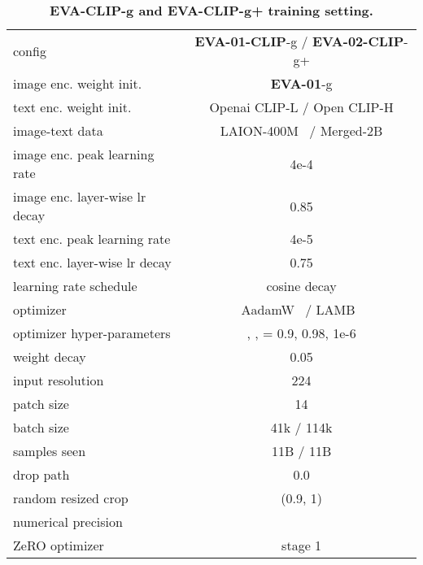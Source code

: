 \documentclass[10pt,twocolumn,letterpaper]{article}
\newcommand{\tablestyle}[2]{\setlength{\tabcolsep}{#1}\renewcommand{\arraystretch}{#2}\centering\footnotesize}
\newcommand{\evapurple}[1]{\textcolor{eva01purple}{#1}}
\newcommand{\evablue}[1]{\textcolor{00blue!80}{#1}}
\newcommand{\evaOne}{{\textbf{\evapurple{EVA-01}}}\xspace}
\newcommand{\evaclip}{{\textbf{\evablue{EVA-CLIP}}}\xspace}
\newcommand{\evaOneclip}{{\textbf{\evablue{EVA-01-CLIP}}}\xspace}
\newcommand{\evaTwoclip}{{\textbf{\evablue{EVA-02-CLIP}}}\xspace}
\newcommand{\suptext}[1]{}
\begin{document}
\begin{table}[h]
\centering
\tablestyle{6pt}{1.2}
\scriptsize
\begin{tabular}{l|c}
config & \evaOneclip-g / \evaTwoclip-g+\\
\shline

image enc. weight init. & \evaOne-g \\
text enc. weight init. & Openai CLIP-L / Open CLIP-H \\

image-text data & LAION-400M~\cite{laion400m} / Merged-2B \\

image enc. peak learning rate &  4e-4 \\
image enc. layer-wise lr decay~\cite{clark2020electra, bao2021beit} & 0.85 \\
text enc. peak learning rate &  4e-5 \\
text enc. layer-wise lr decay~\cite{clark2020electra, bao2021beit} & 0.75 \\

learning rate schedule & cosine decay \\

optimizer & AadamW~\cite{adam,Loshchilov2019adamw} / LAMB~\cite{lamb} \\
optimizer hyper-parameters & , ,  = 0.9, 0.98, 1e-6 \\
weight decay & 0.05 \\

input resolution & 224\suptext{2} \\
patch size & 14\suptext{2} \\

batch size & 41k / 114k \\
samples seen & 11B / 11B \\

drop path~\cite{huang2016deep} & 0.0 \\
random resized crop & (0.9, 1) \\

numerical precision &  ~\cite{rasley2020deepspeed} \\
ZeRO optimizer~\cite{ramesh2021zero} & stage 1 \\

\end{tabular}
\vspace{-.5em}
\caption{\textbf{\evaclip-g and \evaclip-g+ training setting.}}
\label{tab: clip cfg}
\end{table}
\end{document}
